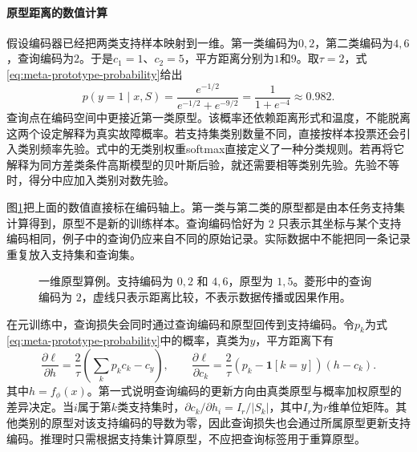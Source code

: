 \paragraph{原型距离的数值计算}
假设编码器已经把两类支持样本映射到一维。第一类编码为$0,2$，第二类编码为$4,6$，查询编码为$2$。于是$c_1=1$、$c_2=5$，平方距离分别为$1$和$9$。取$\tau=2$，式\eqref{eq:meta-prototype-probability}给出
\begin{equation}
 p(y=1\mid x,S)=\frac{e^{-1/2}}{e^{-1/2}+e^{-9/2}}
 =\frac{1}{1+e^{-4}}\approx0.982.
\end{equation}
查询点在编码空间中更接近第一类原型。该概率还依赖距离形式和温度，不能脱离这两个设定解释为真实故障概率。若支持集类别数量不同，直接按样本投票还会引入类别频率先验。式中的无类别权重softmax直接定义了一种分类规则。若再将它解释为同方差类条件高斯模型的贝叶斯后验，就还需要相等类别先验。先验不等时，得分中应加入类别对数先验。

图\ref{fig:meta-prototype-example}把上面的数值直接标在编码轴上。第一类与第二类的原型都是由本任务支持集计算得到，原型不是新的训练样本。查询编码恰好为 $2$ 只表示其坐标与某个支持编码相同，例子中的查询仍应来自不同的原始记录。实际数据中不能把同一条记录重复放入支持集和查询集。
\begin{figure}[htbp]
\centering
{}
\caption{一维原型算例。支持编码为 $0,2$ 和 $4,6$，原型为 $1,5$。菱形中的查询编码为 $2$，虚线只表示距离比较，不表示数据传播或因果作用。}
\label{fig:meta-prototype-example}
\end{figure}

在元训练中，查询损失会同时通过查询编码和原型回传到支持编码。令$p_k$为式\eqref{eq:meta-prototype-probability}中的概率，真类为$y$，平方距离下有
\begin{equation}
\frac{\partial\ell}{\partial h}=\frac{2}{\tau}\left(\sum_kp_kc_k-c_y\right),
\qquad
\frac{\partial\ell}{\partial c_k}=\frac{2}{\tau}(p_k-\mathbf1[k=y])(h-c_k).
\end{equation}
其中$h=f_\phi(x)$。第一式说明查询编码的更新方向由真类原型与概率加权原型的差异决定。当$i$属于第$k$类支持集时，$\partial c_k/\partial h_i=I_r/|S_k|$，其中$I_r$为$r$维单位矩阵。其他类别的原型对该支持编码的导数为零，因此查询损失也会通过所属原型更新支持编码。推理时只需根据支持集计算原型，不应把查询标签用于重算原型。

